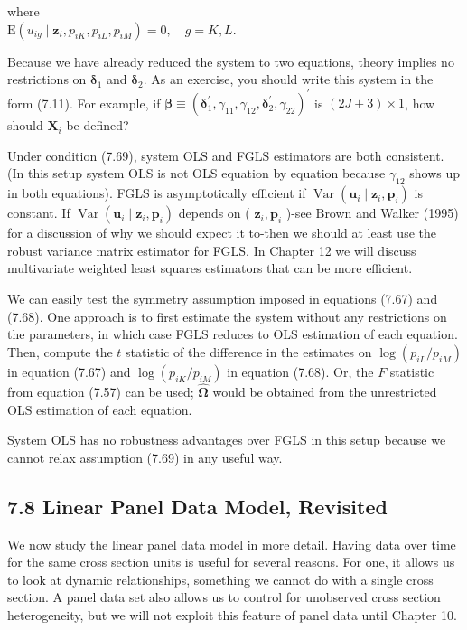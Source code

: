 \documentclass[10pt]{article}
\begin{document}
where\\
$\mathrm{E}\left(u_{i g} \mid \mathbf{z}_{i}, p_{i K}, p_{i L}, p_{i M}\right)=0, \quad g=K, L$.

Because we have already reduced the system to two equations, theory implies no restrictions on $\boldsymbol{\delta}_{1}$ and $\boldsymbol{\delta}_{2}$. As an exercise, you should write this system in the form (7.11). For example, if $\boldsymbol{\beta} \equiv\left(\boldsymbol{\delta}_{1}^{\prime}, \gamma_{11}, \gamma_{12}, \boldsymbol{\delta}_{2}^{\prime}, \gamma_{22}\right)^{\prime}$ is $(2 J+3) \times 1$, how should $\mathbf{X}_{i}$ be defined?

Under condition (7.69), system OLS and FGLS estimators are both consistent. (In this setup system OLS is not OLS equation by equation because $\gamma_{12}$ shows up in both equations). FGLS is asymptotically efficient if $\operatorname{Var}\left(\mathbf{u}_{i} \mid \mathbf{z}_{i}, \mathbf{p}_{i}\right)$ is constant. If $\operatorname{Var}\left(\mathbf{u}_{i} \mid \mathbf{z}_{i}, \mathbf{p}_{i}\right)$ depends on ( $\mathbf{z}_{i}, \mathbf{p}_{i}$ )-see Brown and Walker (1995) for a discussion of why we should expect it to-then we should at least use the robust variance matrix estimator for FGLS. In Chapter 12 we will discuss multivariate weighted least squares estimators that can be more efficient.

We can easily test the symmetry assumption imposed in equations (7.67) and (7.68). One approach is to first estimate the system without any restrictions on the parameters, in which case FGLS reduces to OLS estimation of each equation. Then, compute the $t$ statistic of the difference in the estimates on $\log \left(p_{i L} / p_{i M}\right)$ in equation (7.67) and $\log \left(p_{i K} / p_{i M}\right)$ in equation (7.68). Or, the $F$ statistic from equation (7.57) can be used; $\hat{\boldsymbol{\Omega}}$ would be obtained from the unrestricted OLS estimation of each equation.

System OLS has no robustness advantages over FGLS in this setup because we cannot relax assumption (7.69) in any useful way.

\subsection*{7.8 Linear Panel Data Model, Revisited}
We now study the linear panel data model in more detail. Having data over time for the same cross section units is useful for several reasons. For one, it allows us to look at dynamic relationships, something we cannot do with a single cross section. A panel data set also allows us to control for unobserved cross section heterogeneity, but we will not exploit this feature of panel data until Chapter 10.
\end{document}
